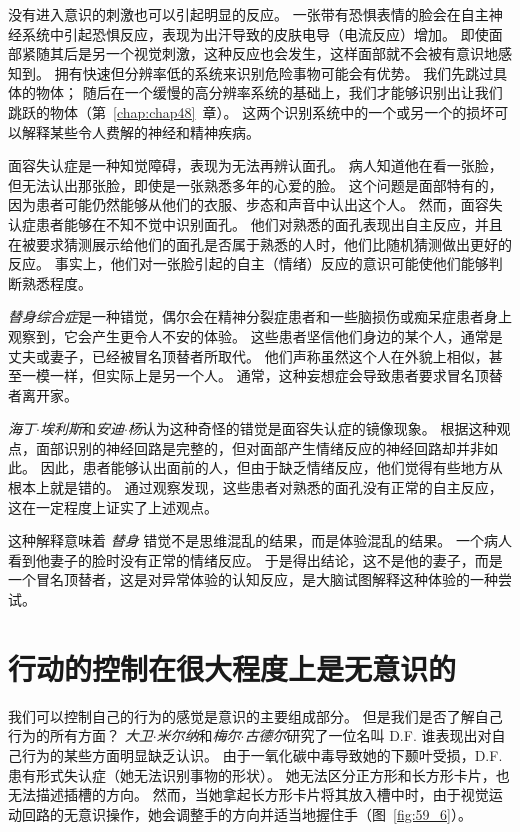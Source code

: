 没有进入意识的刺激也可以引起明显的反应。
一张带有恐惧表情的脸会在自主神经系统中引起恐惧反应，表现为出汗导致的皮肤电导（电流反应）增加。
即使面部紧随其后是另一个视觉刺激，这种反应也会发生，这样面部就不会被有意识地感知到。
拥有快速但分辨率低的系统来识别危险事物可能会有优势。
我们先跳过具体的物体；
随后在一个缓慢的高分辨率系统的基础上，我们才能够识别出让我们跳跃的物体（第~\ref{chap:chap48}~章）。
这两个识别系统中的一个或另一个的损坏可以解释某些令人费解的神经和精神疾病。


面容失认症是一种知觉障碍，表现为无法再辨认面孔。
病人知道他在看一张脸，但无法认出那张脸，即使是一张熟悉多年的心爱的脸。
这个问题是面部特有的，因为患者可能仍然能够从他们的衣服、步态和声音中认出这个人。
然而，面容失认症患者能够在不知不觉中识别面孔。
他们对熟悉的面孔表现出自主反应，并且在被要求猜测展示给他们的面孔是否属于熟悉的人时，他们比随机猜测做出更好的反应。
事实上，他们对一张脸引起的自主（情绪）反应的意识可能使他们能够判断熟悉程度。


\textit{替身综合症}是一种错觉，偶尔会在精神分裂症患者和一些脑损伤或痴呆症患者身上观察到，它会产生更令人不安的体验。
这些患者坚信他们身边的某个人，通常是丈夫或妻子，已经被冒名顶替者所取代。
他们声称虽然这个人在外貌上相似，甚至一模一样，但实际上是另一个人。
通常，这种妄想症会导致患者要求冒名顶替者离开家。


\textit{海丁$\cdot$埃利斯}和\textit{安迪$\cdot$杨}认为这种奇怪的错觉是面容失认症的镜像现象。
根据这种观点，面部识别的神经回路是完整的，但对面部产生情绪反应的神经回路却并非如此。
因此，患者能够认出面前的人，但由于缺乏情绪反应，他们觉得有些地方从根本上就是错的。
通过观察发现，这些患者对熟悉的面孔没有正常的自主反应，这在一定程度上证实了上述观点。

这种解释意味着 \textit{替身} 错觉不是思维混乱的结果，而是体验混乱的结果。
一个病人看到他妻子的脸时没有正常的情绪反应。
于是得出结论，这不是他的妻子，而是一个冒名顶替者，这是对异常体验的认知反应，是大脑试图解释这种体验的一种尝试。


\section{行动的控制在很大程度上是无意识的}

我们可以控制自己的行为的感觉是意识的主要组成部分。 但是我们是否了解自己行为的所有方面？
\textit{大卫$\cdot$米尔纳}和\textit{梅尔$\cdot$古德尔}研究了一位名叫 D.F. 谁表现出对自己行为的某些方面明显缺乏认识。
由于一氧化碳中毒导致她的下颞叶受损，D.F. 患有形式失认症（她无法识别事物的形状）。
她无法区分正方形和长方形卡片，也无法描述插槽的方向。
然而，当她拿起长方形卡片将其放入槽中时，由于视觉运动回路的无意识操作，她会调整手的方向并适当地握住手（图~\ref{fig:59_6}）。


